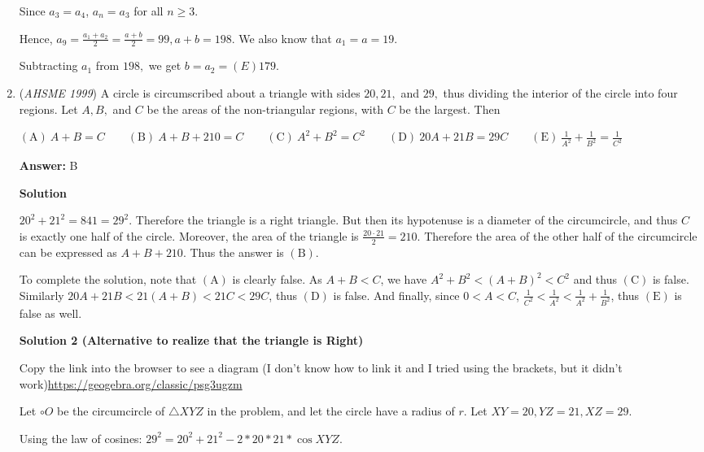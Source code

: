 \begin{enumerate}
 Since $a_3=a_4$, $a_n=a_3$ for all $n\geq3.$

 Hence, $a_9=\frac{a_1+a_2}{2}=\frac{a+b}{2}=99, a+b=198.$ We also know that $a_1=a=19.$ 

 Subtracting $a_1$ from $198,$ we get $b=a_2=\boxed{(E)  179}.$



	\item (\textit{AHSME 1999}) A circle is circumscribed about a triangle with sides $20,21,$ and $29,$ thus dividing the interior of the circle into four regions. Let $A,B,$ and $C$ be the areas of the non-triangular regions, with $C$ be the largest. Then


 $\mathrm{(A) \ }A+B=C \qquad \mathrm{(B) \ }A+B+210=C \qquad \mathrm{(C) \ }A^2+B^2=C^2 \qquad \mathrm{(D) \ }20A+21B=29C \qquad \mathrm{(E) \ } \frac 1{A^2}+\frac 1{B^2}= \frac 1{C^2}$

 \textbf{Answer: }B



\textbf{Solution}

$20^2 + 21^2 = 841 = 29^2$. Therefore the triangle is a right triangle. But then its hypotenuse is a diameter of the circumcircle, and thus $C$ is exactly one half of the circle. Moreover, the area of the triangle is $\frac{20\cdot 21}{2} = 210$. Therefore the area of the other half of the circumcircle can be expressed as $A+B+210$. Thus the answer is $\boxed{\mathrm{(B)}}$.

 To complete the solution, note that $\mathrm{(A)}$ is clearly false. As $A+B < C$, we have $A^2 + B^2 < (A+B)^2 < C^2$ and thus $\mathrm{(C)}$ is false. Similarly $20A + 21B < 21(A+B) < 21C < 29C$, thus $\mathrm{(D)}$ is false. And finally, since $0<A<C$, $\frac 1{C^2} < \frac1{A^2} < \frac 1{A^2} + \frac 1{B^2}$, thus $\mathrm{(E)}$ is false as well.

 



\textbf{Solution 2 (Alternative to realize that the triangle is Right)}

Copy the link into the browser to see a diagram (I don't know how to link it and I tried using the brackets, but it didn't work)\href{https://geogebra.org/classic/psg3ugzm}{https://geogebra.org/classic/psg3ugzm}

 Let $\circ{O}$ be the circumcircle of $\triangle{XYZ}$ in the problem, and let the circle have a radius of $r$. Let $XY=20, YZ=21, XZ=29$.

 Using the law of cosines: $29^2=20^2+21^2-2*20*21*\cos{XYZ}$.


\end{enumerate}
